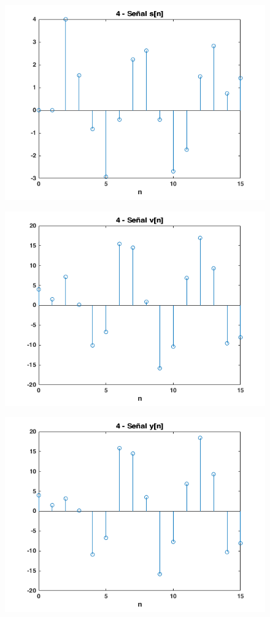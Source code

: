 \documentclass{article}
\begin{document}
\begin{figure} \caption[Figura 14]{}
	\centering
	\includegraphics[width=\linewidth]{./Figures/14.png}
\end{figure}

\begin{figure} \caption[Figura 15]{}
	\centering
	\includegraphics[width=\linewidth]{./Figures/15.png}
\end{figure}

\begin{figure} \caption[Figura 16]{}
	\centering
	\includegraphics[width=\linewidth]{./Figures/16.png}
\end{figure}
\end{document}
